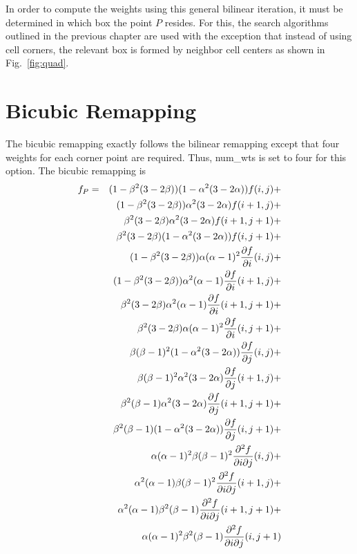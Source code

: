 \documentclass[12pt]{report}
\begin{document}
In order to compute the weights using this general bilinear
iteration, it must be determined in which box the point $P$
resides.  For this, the search algorithms outlined in the
previous chapter are used with the exception that instead
of using cell corners, the relevant box is formed by
neighbor cell centers as shown in Fig.~\ref{fig:quad}.

\chapter{Bicubic Remapping}

The bicubic remapping exactly follows the bilinear remapping
except that four weights for each corner point are required.
Thus, num\_wts is set to four for this option.
The bicubic remapping is
\begin{eqnarray}\label{eq:bicubic}
f_P & = & 
    (1 - \beta^2(3-2\beta))(1 - \alpha^2(3-2\alpha))f(i  ,j  ) + \nonumber \\
& & (1 - \beta^2(3-2\beta))     \alpha^2(3-2\alpha) f(i+1,j  ) + \nonumber \\
& &      \beta^2(3-2\beta)      \alpha^2(3-2\alpha) f(i+1,j+1) + \nonumber \\
& &      \beta^2(3-2\beta) (1 - \alpha^2(3-2\alpha))f(i  ,j+1) + \nonumber \\
& & (1 - \beta^2(3-2\beta))\alpha  (\alpha-1)^2
                        {{\partial f}\over{\partial i}}(i  ,j  ) + \nonumber \\
& & (1 - \beta^2(3-2\beta))\alpha^2(\alpha-1)
                        {{\partial f}\over{\partial i}}(i+1,j  ) + \nonumber \\
& &      \beta^2(3-2\beta) \alpha^2(\alpha-1)
                        {{\partial f}\over{\partial i}}(i+1,j+1) + \nonumber \\
& &      \beta^2(3-2\beta) \alpha  (\alpha-1)^2
                        {{\partial f}\over{\partial i}}(i  ,j+1) + \nonumber \\
& & \beta  (\beta-1)^2(1 - \alpha^2(3-2\alpha))
                        {{\partial f}\over{\partial j}}(i  ,j  ) + \nonumber \\
& & \beta  (\beta-1)^2     \alpha^2(3-2\alpha)
                        {{\partial f}\over{\partial j}}(i+1,j  ) + \nonumber \\
& & \beta^2(\beta-1)       \alpha^2(3-2\alpha)
                        {{\partial f}\over{\partial j}}(i+1,j+1) + \nonumber \\
& & \beta^2(\beta-1)  (1 - \alpha^2(3-2\alpha))
                        {{\partial f}\over{\partial j}}(i  ,j+1) + \nonumber \\
& & \alpha  (\alpha-1)^2\beta  (\beta-1)^2
           {{\partial^2 f}\over{\partial i \partial j}}(i  ,j  ) + \nonumber \\
& & \alpha^2(\alpha-1)  \beta  (\beta-1)^2
           {{\partial^2 f}\over{\partial i \partial j}}(i+1,j  ) + \nonumber \\
& & \alpha^2(\alpha-1)  \beta^2(\beta-1)
           {{\partial^2 f}\over{\partial i \partial j}}(i+1,j+1) + \nonumber \\
& & \alpha  (\alpha-1)^2\beta^2(\beta-1)
           {{\partial^2 f}\over{\partial i \partial j}}(i  ,j+1)
\end{eqnarray}
\end{document}
